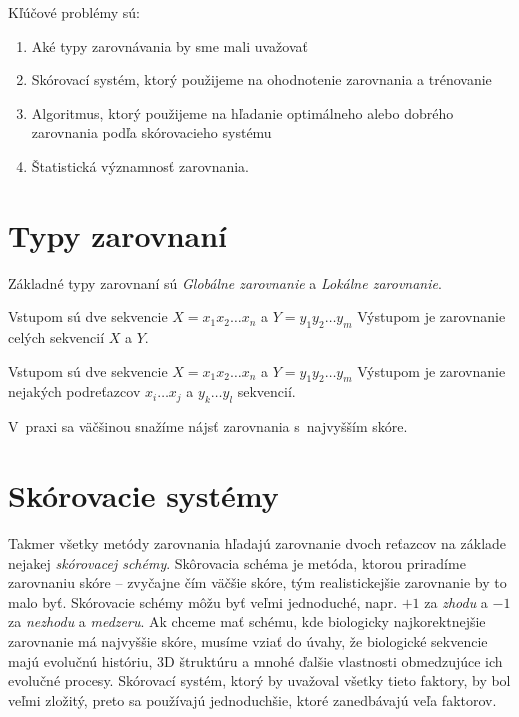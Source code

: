 Kľúčové problémy sú:
\begin{enumerate}
\item Aké typy zarovnávania by sme mali uvažovať
\item Skórovací systém, ktorý použijeme na ohodnotenie zarovnania a trénovanie
\item Algoritmus, ktorý použijeme na hľadanie optimálneho alebo dobrého zarovnania podľa skórovacieho systému
\item Štatistická významnosť zarovnania.
\end{enumerate}

\cite{durbin}

\section{Typy zarovnaní}
Základné typy zarovnaní sú \textit{Globálne zarovnanie} a \textit{Lokálne zarovnanie}.
\begin{df}
Vstupom sú dve sekvencie $X = x_1x_2\dots x_n$ a $Y = y_1y_2\dots y_m$
Výstupom je zarovnanie celých sekvencií $X$ a $Y$.
\end{df}

\begin{df}
Vstupom sú dve sekvencie $X = x_1x_2\dots x_n$ a $Y = y_1y_2\dots y_m$
Výstupom je zarovnanie nejakých podreťazcov $x_i\dots x_j$ a $y_k\dots y_l$ sekvencií.
\end{df}
V~praxi sa väčšinou snažíme nájsť zarovnania s~najvyšším skóre.
\cite{skripta}

\section{Skórovacie systémy}
Takmer všetky metódy zarovnania hľadajú zarovnanie dvoch reťazcov na základe nejakej \textit{skórovacej schémy}. Skôrovacia schéma je metóda, ktorou priradíme zarovnaniu skóre -- zvyčajne čím väčšie skóre, tým realistickejšie zarovnanie by to malo byť.
Skórovacie schémy môžu byť veľmi jednoduché, napr. $+1$ za \textit{zhodu} a $-1$ za \textit{nezhodu} a \textit{medzeru}.
Ak chceme mať schému, kde biologicky najkorektnejšie zarovnanie má najvyššie skóre, musíme vziať do úvahy, že biologické sekvencie majú evolučnú históriu, 3D štruktúru a mnohé ďalšie vlastnosti obmedzujúce ich evolučné procesy. Skórovací systém, ktorý by uvažoval všetky tieto faktory, by bol veľmi zložitý, preto sa používajú jednoduchšie, ktoré zanedbávajú veľa faktorov.
\cite{durbin}

